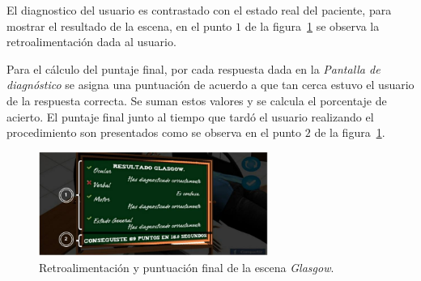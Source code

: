 El diagnostico del usuario es contrastado con el estado real del paciente, para
mostrar el resultado de la escena, en el punto $1$ de la
figura~\ref{fig:glasgow_resultado} se observa la retroalimentación dada al
usuario.

Para el cálculo del puntaje final, por cada respuesta dada en la \emph{Pantalla
    de diagnóstico} se asigna una puntuación de acuerdo a que tan cerca estuvo
el usuario de la respuesta correcta. Se suman estos valores y se calcula el
porcentaje de acierto. El puntaje final junto al tiempo que tardó el usuario
realizando el procedimiento son presentados como se observa en el punto $2$ de
la figura~\ref{fig:glasgow_resultado}.

\begin{figure}[H]
\centering
\includegraphics[width=7.5cm]{../solucion/images/glasgow_resultado.jpg}
\caption{Retroalimentación y puntuación final de la escena \emph{Glasgow}.}
\label{fig:glasgow_resultado}
\end{figure}
